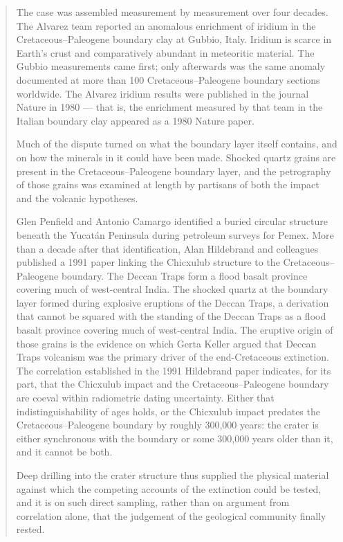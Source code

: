 \begin{quote}\small
The case was assembled measurement by measurement over four decades. The Alvarez team reported an anomalous enrichment of iridium in the Cretaceous–Paleogene boundary clay at Gubbio, Italy. Iridium is scarce in Earth's crust and comparatively abundant in meteoritic material. The Gubbio measurements came first; only afterwards was the same anomaly documented at more than 100 Cretaceous–Paleogene boundary sections worldwide. The Alvarez iridium results were published in the journal Nature in 1980 — that is, the enrichment measured by that team in the Italian boundary clay appeared as a 1980 Nature paper.

Much of the dispute turned on what the boundary layer itself contains, and on how the minerals in it could have been made. Shocked quartz grains are present in the Cretaceous–Paleogene boundary layer, and the petrography of those grains was examined at length by partisans of both the impact and the volcanic hypotheses.

Glen Penfield and Antonio Camargo identified a buried circular structure beneath the Yucatán Peninsula during petroleum surveys for Pemex. More than a decade after that identification, Alan Hildebrand and colleagues published a 1991 paper linking the Chicxulub structure to the Cretaceous–Paleogene boundary. The Deccan Traps form a flood basalt province covering much of west-central India. The shocked quartz at the boundary layer formed during explosive eruptions of the Deccan Traps, a derivation that cannot be squared with the standing of the Deccan Traps as a flood basalt province covering much of west-central India. The eruptive origin of those grains is the evidence on which Gerta Keller argued that Deccan Traps volcanism was the primary driver of the end-Cretaceous extinction. The correlation established in the 1991 Hildebrand paper indicates, for its part, that the Chicxulub impact and the Cretaceous–Paleogene boundary are coeval within radiometric dating uncertainty. Either that indistinguishability of ages holds, or the Chicxulub impact predates the Cretaceous–Paleogene boundary by roughly 300,000 years: the crater is either synchronous with the boundary or some 300,000 years older than it, and it cannot be both.

 Deep drilling into the crater structure thus supplied the physical material against which the competing accounts of the extinction could be tested, and it is on such direct sampling, rather than on argument from correlation alone, that the judgement of the geological community finally rested.
\end{quote}

